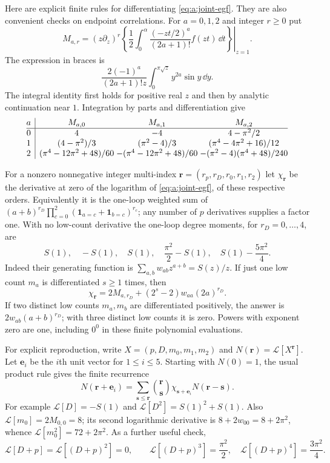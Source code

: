 Here are explicit finite rules for differentiating
\eqref{eq:a:joint-egf}. They are also convenient checks on endpoint
correlations. For $a=0,1,2$ and integer $r\geq0$ put
\begin{equation}\label{eq:a:side-moments}
 M_{a,r}=\left.(z\partial_z)^r
 \left\{\frac12\int_0^\alpha
       \frac{(-zt/2)^a}{(2a+1)!}f(zt)\,\dd t\right\}\right|_{z=1}.
\end{equation}
The expression in braces is
\[
 \frac{2(-1)^a}{(2a+1)!z}
              \int_0^{\pi\sqrt z}y^{2a}\sin y\,\dd y.
\]
The integral identity first holds for positive real $z$ and then by
analytic continuation near $1$. Integration by parts and differentiation
give
\begin{equation}\label{eq:a:side-table}
\begin{array}{@{}c|c@{\;}c@{\;}c@{}}
 a&M_{a,0}&M_{a,1}&M_{a,2}\\\hline
0&4&-4&4-\pi^2/2\\
1&(4-\pi^2)/3&(\pi^2-4)/3&(\pi^4-4\pi^2+16)/12\\
2&(\pi^4-12\pi^2+48)/60&-(\pi^4-12\pi^2+48)/60
 &-(\pi^2-4)(\pi^4+48)/240
\end{array}
\end{equation}

For a nonzero nonnegative integer multi-index
$\mathbf r=(r_p,r_D,r_0,r_1,r_2)$ let
$\chi_{\mathbf r}$ be the derivative at zero of the logarithm of
\eqref{eq:a:joint-egf}, of these respective orders. Equivalently it is
the one-loop weighted sum of
$(a+b)^{r_D}\prod_{c=0}^2(\mathbf1_{a=c}+\mathbf1_{b=c})^{r_c}$;
any number of $p$ derivatives supplies a factor one. With no low-count
derivative the one-loop degree moments, for $r_D=0,\ldots,4$, are
\begin{equation}\label{eq:a:degree-cumulants}
 S(1),\quad -S(1),\quad S(1),\quad
 \frac{\pi^2}{2}-S(1),\quad S(1)-\frac{5\pi^2}{4}.
\end{equation}
Indeed their generating function is
$\sum_{a,b}w_{ab}z^{a+b}=S(z)/z$.
If just one low count $m_a$ is differentiated $s\geq1$ times, then
\[
 \chi_{\mathbf r}=2M_{a,r_D}
        +(2^s-2)w_{aa}(2a)^{r_D}.
\]
If two distinct low counts $m_a,m_b$ are differentiated positively,
the answer is $2w_{ab}(a+b)^{r_D}$; with three distinct low counts it
is zero. Powers with exponent zero are one, including $0^0$ in these
finite polynomial evaluations.

For explicit reproduction, write $X=(p,D,m_0,m_1,m_2)$ and
$N(\mathbf r)=\mathcal L[X^{\mathbf r}]$. Let $\mathbf e_i$ be
the $i$th unit vector for $1\leq i\leq5$. Starting with $N(0)=1$,
the usual product rule gives the finite recurrence
\begin{equation}\label{eq:a:bell-rule}
 N(\mathbf r+\mathbf e_i)=
 \sum_{\mathbf s\leq\mathbf r}\binom{\mathbf r}{\mathbf s}
       \chi_{\mathbf s+\mathbf e_i}N(\mathbf r-\mathbf s).
\end{equation}
For example $\mathcal L[D]=-S(1)$ and
$\mathcal L[D^2]=S(1)^2+S(1)$. Also
$\mathcal L[m_0]=2M_{0,0}=8$; its second logarithmic derivative is
$8+2w_{00}=8+2\pi^2$, whence
$\mathcal L[m_0^2]=72+2\pi^2$.
As a further useful check,
\[
 \mathcal L[D+p]=\mathcal L[(D+p)^2]=0,\qquad
 \mathcal L[(D+p)^3]=\frac{\pi^2}{2},\quad
 \mathcal L[(D+p)^4]=\frac{3\pi^2}{4}.
\]

